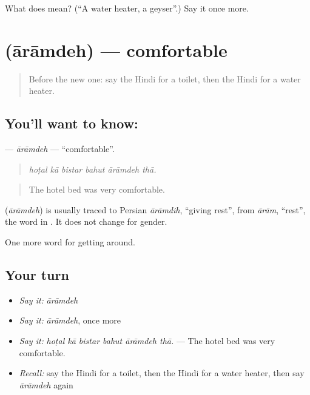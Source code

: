 \begin{tcolorbox}[breakable,colback=teal!4,colframe=teal!35!black,title={Before you move on}]
What does  mean? (\textquotedblleft{}A water heater, a geyser\textquotedblright{}.) Say it once more.
\end{tcolorbox}
\section[\texorpdfstring{\hi{आरामदेह} (ārāmdeh)}{आरामदेह (ārāmdeh)}]{ (ārāmdeh) — comfortable}

\label{lesson:HI-C414-aramdeh}



\begin{quote}
Before the new one: say the Hindi for a toilet, then the Hindi for a water heater.
\end{quote}

\subsection*{You'll want to know: }
\textbf{} — \emph{ārāmdeh} — \textquotedblleft{}comfortable\textquotedblright{}.

\begin{quote}
     
\end{quote}

\begin{quote}
\emph{hoṭal kā bistar bahut ārāmdeh thā.}
\end{quote}

\begin{quote}
The hotel bed was very comfortable.
\end{quote}

\begin{cousinweb}
\textbf{} (\emph{ārāmdeh}) is usually traced to Persian \emph{ārāmdih}, \textquotedblleft{}giving rest\textquotedblright{}, from \emph{ārām}, \textquotedblleft{}rest\textquotedblright{}, the word in  . It does not change for gender.
\end{cousinweb}

\begin{grammarlens}[title={What you've built}]
One more word for getting around.
\end{grammarlens}

\subsection*{Your turn}
\begin{itemize}
\raggedright
  \item \emph{Say it:} \emph{ārāmdeh}
  \item \emph{Say it:} \emph{ārāmdeh}, once more
  \item \emph{Say it:} \emph{hoṭal kā bistar bahut ārāmdeh thā.} — The hotel bed was very comfortable.
  \item \emph{Recall:} say the Hindi for a toilet, then the Hindi for a water heater, then say \emph{ārāmdeh} again
\end{itemize}

